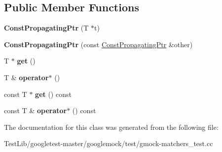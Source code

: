 \subsection*{Public Member Functions}
\begin{DoxyCompactItemize}
\item 
\mbox{\label{classtesting_1_1gmock__matchers__test_1_1ConstPropagatingPtr_a06da70663daa274fb8ca3352f039d609}} 
{\bfseries Const\+Propagating\+Ptr} (T $\ast$t)
\item 
\mbox{\label{classtesting_1_1gmock__matchers__test_1_1ConstPropagatingPtr_ae7620c62ba340603968896d5d5400ed1}} 
{\bfseries Const\+Propagating\+Ptr} (const \hyperlink{classtesting_1_1gmock__matchers__test_1_1ConstPropagatingPtr}{Const\+Propagating\+Ptr} \&other)
\item 
\mbox{\label{classtesting_1_1gmock__matchers__test_1_1ConstPropagatingPtr_a39a09d46453380ec1b8be8ce40adc453}} 
T $\ast$ {\bfseries get} ()
\item 
\mbox{\label{classtesting_1_1gmock__matchers__test_1_1ConstPropagatingPtr_ad77bbeaa18f84cbd6f3dc7021904f1e3}} 
T \& {\bfseries operator$\ast$} ()
\item 
\mbox{\label{classtesting_1_1gmock__matchers__test_1_1ConstPropagatingPtr_a92d7c8429246ef33a020e8a3d840b9c3}} 
const T $\ast$ {\bfseries get} () const
\item 
\mbox{\label{classtesting_1_1gmock__matchers__test_1_1ConstPropagatingPtr_aad99a528754294ab397378034686ae3a}} 
const T \& {\bfseries operator$\ast$} () const
\end{DoxyCompactItemize}


The documentation for this class was generated from the following file\+:\begin{DoxyCompactItemize}
\item 
Test\+Lib/googletest-\/master/googlemock/test/gmock-\/matchers\+\_\+test.\+cc\end{DoxyCompactItemize}
